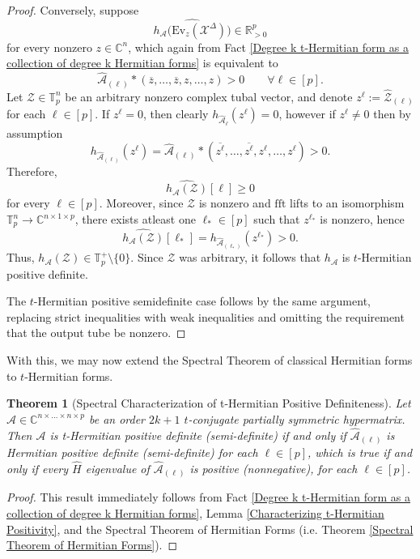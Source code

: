 \documentclass[11pt]{article}
\newtheorem{theorem}{Theorem}[section]
\begin{document}
\begin{proof}
    Conversely, suppose 
    \[\widehat{h_{\mathcal{A}}\big(\mathrm{Ev}_z(\mathcal{X}^{\Delta})\big)}\in \mathbb{R}_{>0}^p\]
    for every nonzero $z\in \mathbb{C}^n$, which again from Fact \ref{Degree k t-Hermitian form as a collection of degree k Hermitian forms} is equivalent to 
    \[\widehat{\mathcal{A}}_{(\ell)}*(\overline{z},\dots,\overline{z},z,\dots,z) > 0\qquad \forall \ell\in [p].\]
    Let $\mathcal{Z}\in \mathbb{T}_p^n$ be an arbitrary nonzero complex tubal vector, and denote $z^{\ell} := \widehat{\mathcal{Z}}_{(\ell)}$ for each $\ell\in [p]$. If $z^{\ell}=0$, then clearly $h_{\widehat{\mathcal{A}}_{\ell}}(z^{\ell}) = 0$, however if $z^{\ell}\neq 0$ then by assumption 
    \[h_{\widehat{\mathcal{A}}_{(\ell)}}(z^{\ell}) = \widehat{\mathcal{A}}_{(\ell)}*(\overline{z^{\ell}},\dots,\overline{z^{\ell}},z^{\ell},\dots,z^{\ell}) > 0.\]
    Therefore, 
    \[\widehat{h_{\mathcal{A}}(\mathcal{Z})}[\ell] \geq 0\]
    for every $\ell\in [p]$. Moreover, since $\mathcal{Z}$ is nonzero and $\mathrm{fft}$ lifts to an isomorphism $\mathbb{T}_p^n\rightarrow \mathbb{C}^{n\times 1\times p}$, there exists atleast one $\ell_*\in [p]$ such that $z^{\ell_*}$ is nonzero, hence 
    \[\widehat{h_{\mathcal{A}}(\mathcal{Z})}[\ell_*] = h_{\widehat{\mathcal{A}}_{(\ell_*)}}(z^{\ell_*}) > 0.\]
    Thus, $h_{\mathcal{A}}(\mathcal{Z})\in \mathbb{T}_p^+\setminus \{0\}$. Since $\mathcal{Z}$ was arbitrary, it follows that $h_{\mathcal{A}}$ is $t$-Hermitian positive definite. 

    The $t$-Hermitian positive semidefinite case follows by the same argument, replacing strict inequalities with weak inequalities and omitting the requirement that the output tube be nonzero. 
\end{proof}
With this, we may now extend the Spectral Theorem of classical Hermitian forms to $t$-Hermitian forms. 
\begin{theorem}[Spectral Characterization of t-Hermitian Positive Definiteness]\label{Higher order t-Hermitian positive definite characterization}
    Let $\mathcal{A}\in \mathbb{C}^{n\times...\times n\times p}$ be an order $2k+1$ $t$-conjugate partially symmetric hypermatrix. Then $\mathcal{A}$ is t-Hermitian positive definite (semi-definite) if and only if $\widehat{\mathcal{A}}_{(\ell)}$ is Hermitian positive definite (semi-definite) for each $\ell\in [p]$, which is true if and only if every $\widehat{H}$ eigenvalue of $\widehat{\mathcal{A}}_{(\ell)}$ is positive (nonnegative), for each $\ell\in [p]$.
\end{theorem}
\begin{proof}
    This result immediately follows from Fact \ref{Degree k t-Hermitian form as a collection of degree k Hermitian forms}, Lemma \ref{Characterizing t-Hermitian Positivity}, and the Spectral Theorem of Hermitian Forms (i.e. Theorem \ref{Spectral Theorem of Hermitian Forms}). 
\end{proof}
\end{document}
